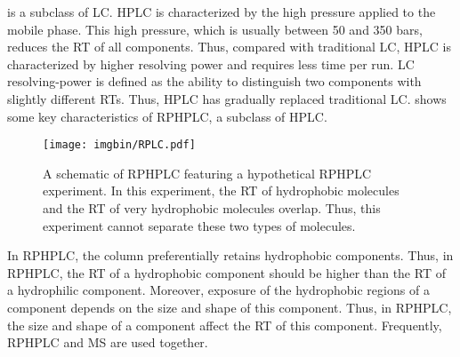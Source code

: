  is a subclass of \gls{LC}.
\Gls{HPLC} is characterized by the high pressure applied to the mobile phase. 
This high pressure, which is usually between 50 and 350 bars, reduces the \gls{RT} of all components. 
Thus, compared with traditional \gls{LC}, \gls{HPLC} is characterized by higher resolving power and requires less time per run.
\gls{LC} resolving-power is defined as the ability to distinguish two components with slightly different \glspl{RT}.
Thus, \gls{HPLC} has gradually replaced traditional \gls{LC}. 
 shows some key characteristics of \gls{RPHPLC}, a subclass of \gls{HPLC}.
\begin{figure}
\texttt{[image: imgbin/RPLC.pdf]}
\caption[
	A schematic of \acrshort{RPHPLC}]{
	A schematic of \acrshort{RPHPLC} featuring a hypothetical \acrshort{RPHPLC} experiment.
	In this experiment, the \acrshort{RT} of hydrophobic molecules and the \acrshort{RT} of very hydrophobic molecules overlap.
	Thus, this experiment cannot separate these two types of molecules.
	\label{LC_overview}	
}
\end{figure}
In \gls{RPHPLC}, the column preferentially retains hydrophobic components.
Thus, in \gls{RPHPLC}, the \gls{RT} of a hydrophobic component should be higher than the \gls{RT} of a hydrophilic component.
Moreover, exposure of the hydrophobic regions of a component depends on the size and shape of this component.
Thus, in \gls{RPHPLC}, the size and shape of a component affect the \gls{RT} of this component.
Frequently, \gls{RPHPLC} and \gls{MS} are used together.

